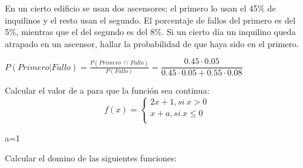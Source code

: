\documentclass[addpoints,spanish, 12pt,a4paper]{exam}
\begin{document}
\begin{questions}

\question[8] En un cierto edificio se usan dos ascensores; el primero lo usan el 45\% de inquilinos y el resto usan el segundo. El porcentaje de fallos del primero es del 5\%, mientras que el del segundo es del 8\%. Si un cierto día un inquilino queda atrapado en un ascensor, hallar la probabilidad de que haya sido en el primero.
\begin{solution}
$P(Primero|Fallo)=\frac{P(Primero \ \cap \ Fallo)}{P(Fallo)}=\dfrac{0.45 \cdot 0.05}{0.45 \cdot 0.05 + 0.55 \cdot 0.08}$    
\end{solution}

\question[6] 
Calcular el valor de a para que la función sea continua:
\[f(x)=\left\{ \begin{matrix}
   2x+1, si \ x > 0  \\
   x+a , si  \   x \le 0  \\
\end{matrix} \right.\]
\begin{solution}
    a=1
\end{solution}

\question Calcular el domino de las siguientes funciones:
\begin{parts}
    \part[4] 
    $f(x)=\sqrt[6]{\dfrac{x^{2} - 3 x + 2}{x^{2} + 2 x}}$
    \begin{solution}
        $\left(-\infty, -2\right) \cup \left(0, 1\right] \cup \left[2, \infty\right)$
    \end{solution}

\end{parts}
\end{questions}
\end{document}
